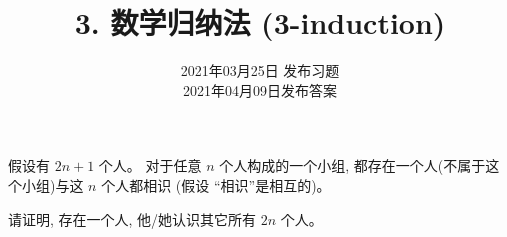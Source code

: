 \documentclass[a4paper, justified]{tufte-handout}
\title{3. 数学归纳法 (3-induction)}
\date{2021年03月25日 发布习题 \\ 2021年04月09日发布答案}
\begin{document}
\maketitle
\noplagiarism %
\begin{abstract}
  \begin{center}
  \end{center}
\end{abstract}
\beginrequired

\begin{problem}
  假设有 $2n + 1$ 个人。
  对于任意 $n$ 个人构成的一个小组,
  都存在一个人(不属于这个小组)与这 $n$ 个人都相识 (假设 ``相识''是相互的)。

  \noindent 请证明, 存在一个人, 他/她认识其它所有 $2n$ 个人。
\end{problem}
\end{document}

